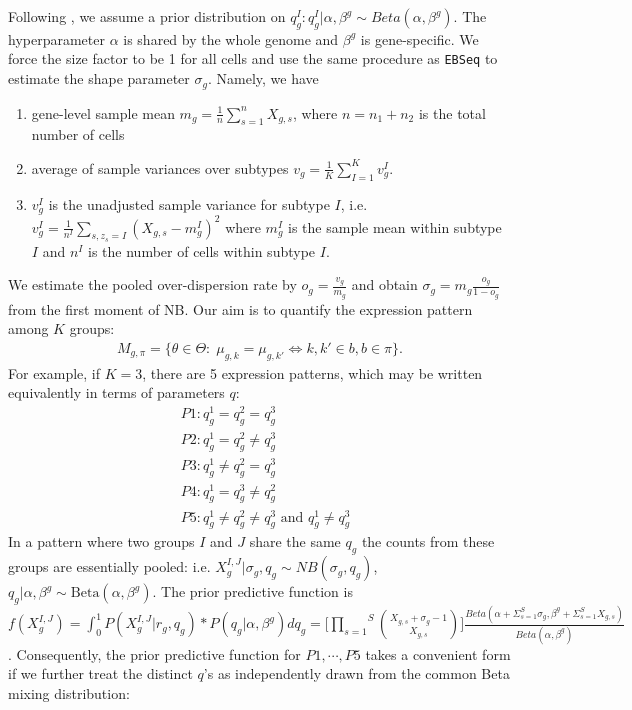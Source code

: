 \documentclass[aoas,preprint]{imsart}
\begin{document}
Following  \cite{ref:Leng}, we assume a prior distribution on $q_g^I : q_g^I | \alpha, \beta^{g} \sim Beta(\alpha, \beta^{g}).$ The hyperparameter $\alpha$ is shared by the whole genome and $\beta^{g}$ is gene-specific.  We force the size factor to be 1 for all cells and use the same procedure as \texttt{EBSeq} to estimate the shape parameter $\sigma_g$. Namely, we have
\begin{enumerate}
\item gene-level sample mean $m_g = \frac{1}{n}\sum_{s = 1}^n X_{g,s}$, where $n = n_1 + n_2$ is the total number of cells \\
\item average of sample variances over subtypes $v_g = \frac{1}{K} \sum_{I = 1}^K v_g^I$.\\
\item $v_g^I$ is the unadjusted sample variance for subtype $I$, i.e. $v_g^I = \frac{1}{n^I}\sum_{s, z_s = I} (X_{g,s} - m_g^I)^2$ where $m_g^I$ is the sample mean within subtype $I$ and $n^I$ is the number of cells within subtype $I$.\\
\end{enumerate}
We estimate the pooled over-dispersion rate by $o_g = \frac{v_g}{m_g}$ and obtain $\sigma_g = m_g \frac{o_g}{1 - o_g}$ from the first moment of NB.  Our aim is to quantify the expression pattern among 
$K$ groups: 
\begin{eqnarray*}
M_{g,\pi} = \{ \theta \in \Theta: \; \mu_{g,k} = \mu_{g,k'} \iff k,k' \in b, b \in \pi \}.
\end{eqnarray*}
For example, if $K = 3$, there are 5 expression patterns, which may be written equivalently 
in terms of parameters $q$:
\begin{align*}
&P1: q_g^1 = q_g^2 = q_g^3\\
&P2: q_g^1 = q_g^2 \neq q_g^3\\
&P3: q_g^1 \neq q_g^2 = q_g^3\\
&P4: q_g^1 = q_g^3 \neq q_g^2\\
&P5: q_g^1 \neq q_g^2 \neq q_g^3 \text{ and } q_g^1 \neq q_g^3
\end{align*}
In a pattern where two groups $I$ and $J$ share the same $q_g$ 
the counts from these groups are essentially pooled: 
 i.e. $X_g^{I, J} | \sigma_{g}, q_g \sim NB(\sigma_{g}, q_g)$, $q_g | \alpha, \beta^{g} \sim \text{Beta}(\alpha, \beta^{g})$. The prior predictive function is
 $f(X_g^{I,J}) = \int_0 ^1 P(X_g^{I,J} | r_{g}, q_g) * P(q_g | \alpha, \beta^{g}) dq_g = \Big[ \overset{S}{\underset{s = 1}{\prod}} {X_{g,s} + \sigma_{g} - 1 \choose X_{g,s}} \Big] \frac{Beta(\alpha + \Sigma_{s = 1}^S \sigma_{g}, \beta^{g} + \Sigma_{s = 1}^S X_{g,s})}{Beta(\alpha, \beta^{g})}$.  
Consequently, the prior predictive function for $P1, \cdots , P5$ takes a convenient form
if we further treat the distinct $q$'s as independently drawn from the  common Beta mixing distribution:
\end{document}
